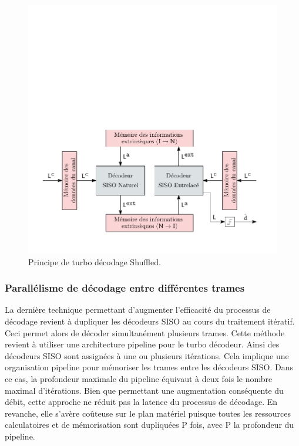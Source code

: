 \begin{figure}[!h]
	\centering
	\includegraphics{main/ch4_fig/ipe/shuffled_2.pdf}
	\caption{Principe de turbo décodage Shuffled. \label{fig:turbo_shuff}}
\end{figure}

\subsubsection{Parallélisme de décodage entre différentes trames}
La dernière technique permettant d'augmenter l'efficacité du processus de décodage revient à dupliquer les décodeurs 
SISO au cours du traitement itératif. Ceci permet alors de décoder simultanément plusieurs trames. Cette méthode revient 
à utiliser une architecture pipeline pour le turbo décodeur. Ainsi des décodeurs SISO sont assignées à une ou plusieurs 
itérations. Cela implique une organisation pipeline pour mémoriser les trames entre les décodeurs SISO. Dans ce cas, la 
profondeur maximale du pipeline équivaut à deux fois le nombre maximal d'itérations. Bien que permettant une augmentation 
conséquente du débit, cette approche ne réduit pas la latence du processus de décodage. En revanche, elle s'avère 
coûteuse sur le plan matériel puisque toutes les ressources calculatoires et de mémorisation sont dupliquées P fois, 
avec P la profondeur du pipeline.

